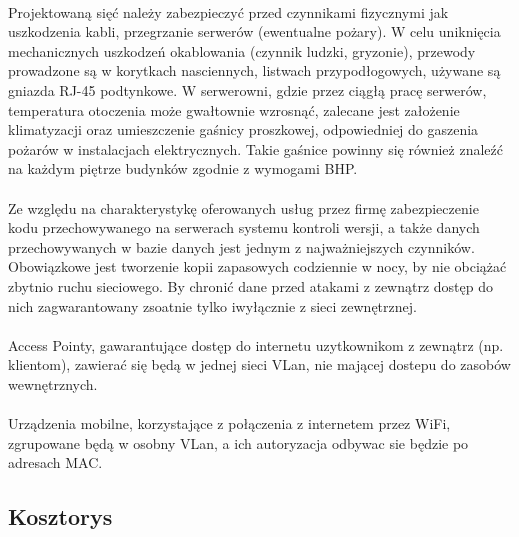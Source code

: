 \paragraph{}
Projektowaną sięć należy zabezpieczyć przed czynnikami fizycznymi jak uszkodzenia kabli, przegrzanie serwerów (ewentualne pożary). W celu uniknięcia mechanicznych uszkodzeń okablowania (czynnik ludzki, gryzonie), przewody prowadzone są w korytkach nasciennych, listwach przypodłogowych, używane są gniazda RJ-45 podtynkowe. W serwerowni, gdzie przez ciągłą pracę serwerów, temperatura otoczenia może gwałtownie wzrosnąć, zalecane jest założenie klimatyzacji oraz umieszczenie gaśnicy proszkowej, odpowiedniej do gaszenia pożarów w instalacjach elektrycznych. Takie gaśnice powinny się również znaleźć na każdym piętrze budynków zgodnie z wymogami BHP.

\paragraph{}
Ze względu na charakterystykę oferowanych usług przez firmę zabezpieczenie kodu przechowywanego na serwerach systemu kontroli wersji, a także danych przechowywanych w bazie danych jest jednym z najważniejszych czynników. Obowiązkowe jest tworzenie kopii zapasowych codziennie w nocy, by nie obciążać zbytnio ruchu sieciowego. By chronić dane przed atakami z zewnątrz dostęp do nich zagwarantowany zsoatnie tylko iwyłącznie z sieci zewnętrznej.

\paragraph{}
Access Pointy, gawarantujące dostęp do internetu uzytkownikom z zewnątrz (np. klientom), zawierać się będą w jednej sieci VLan, nie mającej dostepu do zasobów wewnętrznych.

\paragraph{}
Urządzenia mobilne, korzystające z połączenia z internetem przez WiFi, zgrupowane będą w osobny VLan, a ich autoryzacja odbywac sie będzie po adresach MAC.

\subsection{Kosztorys}
